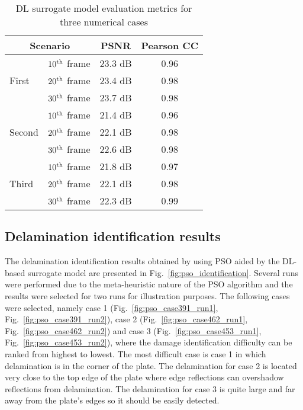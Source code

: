 \documentclass[sn-mathphys-num]{sn-jnl}%
\begin{document}
\begin{table}[h]
	\caption{DL surrogate model evaluation metrics for three numerical cases}
	\label{tab:psnr_pearson}
	\begin{tabular*}{\textwidth}{@{\extracolsep{\fill}}llcc}
		\toprule
		\multicolumn{2}{c}{Scenario} & PSNR    & Pearson CC \\ 
		\midrule
		\multirow{3}{*}{First} & $10\textsuperscript{th}$ frame & 23.3 dB & 
		0.96 \\ 
		& $20\textsuperscript{th}$ frame & 23.4 dB & 0.98 \\ 
		& $30\textsuperscript{th}$ frame & 23.7 dB & 0.98 \\ 
		\midrule
		\multirow{3}{*}{Second} & $10\textsuperscript{th}$ frame & 21.4 dB & 
		0.96 \\ 
		& $20\textsuperscript{th}$ frame & 22.1 dB & 0.98 \\ 
		& $30\textsuperscript{th}$ frame & 22.6 dB & 0.98 \\ 
		\midrule
		\multirow{3}{*}{Third} & $10\textsuperscript{th}$ frame & 21.8 dB & 
		0.97 \\ 
		& $20\textsuperscript{th}$ frame & 22.1 dB & 0.98 \\ 
		& $30\textsuperscript{th}$ frame & 22.3 dB & 0.99 \\ 
		\bottomrule
	\end{tabular*}
\end{table}

	\subsection{Delamination identification results}
	The delamination identification results obtained by using PSO aided by the 
	DL-based surrogate model are presented in Fig.~\ref{fig:pso_identification}.
	Several runs were performed due to the meta-heuristic nature of the PSO 
	algorithm and the results were selected for two runs for illustration 
	purposes.
	The following cases were selected, namely case 1 
	(Fig.~\ref{fig:pso_case391_run1}, Fig.~\ref{fig:pso_case391_run2}), case 2 
	(Fig.~\ref{fig:pso_case462_run1}, Fig.~\ref{fig:pso_case462_run2}) and case 
	3 (Fig.~\ref{fig:pso_case453_run1}, Fig.~\ref{fig:pso_case453_run2}),  
	where the damage identification difficulty can be ranked from highest to 
	lowest.
	The most difficult case is case 1 in which delamination is in the corner of 
	the plate.
	The delamination for case 2 is located very close to the top edge of the 
	plate where edge reflections can overshadow reflections from delamination.
	The delamination for case 3 is quite large and far away from the plate's 
	edges so it should be easily detected.
	
\end{document}
